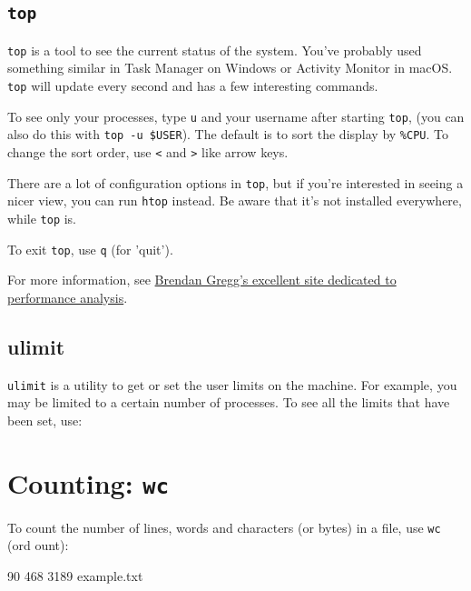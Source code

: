 \begin{prompt}
\end{prompt}

\subsection{\texttt{top}}
\verb|top| is a tool to see the current status of the system. You've probably used
something similar in Task Manager on Windows or Activity Monitor in macOS. \verb|top|
will update every second and has a few interesting commands.

To see only your processes, type \verb|u| and your username after starting \verb|top|, (you can also do
this with \verb|top -u $USER|). The default is to sort the display by \verb|%CPU|.
To change the sort order, use \verb|<| and \verb|>| like arrow keys.

There are a lot of configuration options in \verb|top|, but if you're interested in
seeing a nicer view, you can run \verb|htop| instead. Be aware that it's not
installed everywhere, while \verb|top| is.

To exit \verb|top|, use \verb|q| (for 'quit').

For more information, see \href{http://brendangregg.com}{Brendan Gregg's excellent
site dedicated to performance analysis}.

\subsection{ulimit}
\verb|ulimit| is a utility to get or set the user limits on the machine. For
example, you may be limited to a certain number of processes. To see all the
limits that have been set, use:

\begin{prompt}
\end{prompt}

\section{Counting: \texttt{wc}}

To count the number of lines, words and characters (or bytes) in a file, use \verb|wc| (ord ount):

\begin{prompt}
      90     468    3189  example.txt
\end{prompt}

